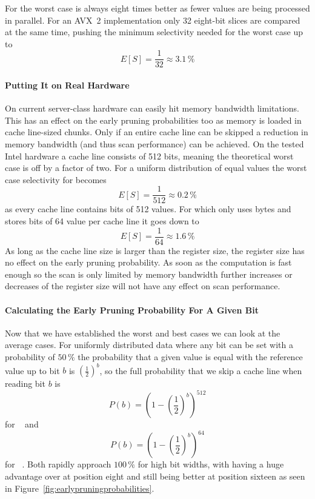 For \bs{} the worst case is always eight times better as fewer values are being
processed in parallel. For an AVX~2 implementation only 32 eight-bit slices are
compared at the same time, pushing the minimum selectivity needed for the worst
case up to $$E[S]=\frac{1}{32}\approx 3.1\,\%$$

\paragraph{Putting It on Real Hardware}

On current server-class hardware \bwv{} can easily hit memory bandwidth
limitations. This has an effect on the early pruning probabilities too as
memory is loaded in cache line-sized chunks. Only if an entire cache line can
be skipped a reduction in memory bandwidth (and thus scan performance) can be
achieved. On the tested Intel hardware a cache line consists of 512 bits,
meaning the theoretical worst case is off by a factor of two. For a uniform
distribution of equal values the worst case selectivity for \bwv{} becomes
$$E[S]=\frac{1}{512}\approx 0.2\,\%$$ as every cache line contains bits of 512
values. For \bs{} which only uses bytes and stores bits of 64 value per cache
line it goes down to $$E[S]=\frac{1}{64}\approx 1.6\,\%$$ As long as the cache
line size is larger than the register size, the register size has no effect on
the early pruning probability. As soon as the computation is fast enough so the
scan is only limited by memory bandwidth further increases or decreases of the
register size will not have any effect on scan performance.

\paragraph{Calculating the Early Pruning Probability For A Given Bit}

Now that we have established the worst and best cases we can look at the
average cases. For uniformly distributed data where any bit can be set with a
probability of $50\,\%$ the probability that a given value is equal with the
reference value up to bit $b$ is ${\left(\frac{1}{2}\right)}^b$,
so the full probability that we skip a cache line when reading bit $b$ is
$$P(b)={\left(1-{\left(\frac{1}{2}\right)}^b\right)}^{512}$$
for \bwv{}~\cite{BitWeaving} and
$$P(b)={\left(1-{\left(\frac{1}{2}\right)}^b\right)}^{64}$$
for \bs{}~\cite{ByteSlice}. Both rapidly approach $100\,\%$ for high bit widths,
with \bs{} having a huge advantage over \bwv{} at position eight and still being
better at position sixteen as seen in
Figure~\ref{fig:earlypruningprobabilities}.

